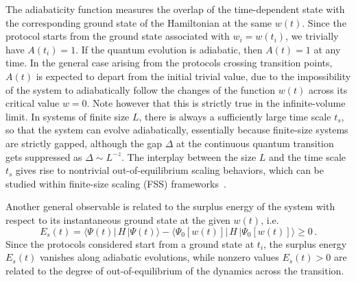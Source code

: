 The adiabaticity function measures the overlap of the time-dependent
state with the corresponding ground state of the Hamiltonian at the
same $w(t)$. Since the protocol starts from the ground state
associated with $w_i=w(t_i)$, we trivially have $A(t_i) = 1$.  If the
quantum evolution is adiabatic, then $A(t)=1$ at any time.  In the
general case arising from the protocols crossing transition points,
$A(t)$ is expected to depart from the initial trivial value, due to
the impossibility of the system to adiabatically follow the changes of
the function $w(t)$ across its critical value $w=0$.  Note however
that this is strictly true in the infinite-volume limit.  In systems
of finite size $L$, there is always a sufficiently large time scale
$t_s$, so that the system can evolve adiabatically, essentially
because finite-size systems are strictly gapped, although the gap
$\Delta$ at the continuous quantum transition gets suppressed as
$\Delta \sim L^{-z}$. The interplay between the size $L$ and the time
scale $t_s$ gives rise to nontrivial out-of-equilibrium scaling
behaviors, which can be studied within finite-size scaling (FSS)
frameworks~\cite{RV-21,RV-20}.

Another general observable is related to the surplus energy of the
system with respect to its instantaneous ground state at the given
$w(t)$, i.e.
\begin{equation}
  E_s(t) = \langle \Psi(t) | \, H \, | \Psi(t) \rangle - \langle
  \Psi_0[w(t)] | \, H \,| \Psi_0[w(t)] \rangle \ge 0 \,.
  \label{etdiff}
  \end{equation}
Since the protocols considered start from a ground state at $t_i$, the
surplus energy $E_s(t)$ vanishes along adiabatic evolutions, while
nonzero values $E_s(t)>0$ are related to the degree of
out-of-equilibrium of the dynamics across the transition.

